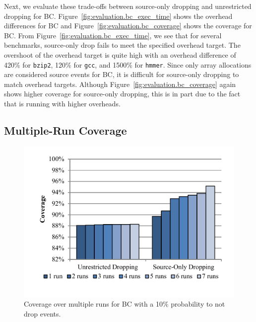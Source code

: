 Next, we evaluate these trade-offs between source-only dropping and unrestricted dropping for BC.
Figure~\ref{fig:evaluation.bc_exec_time} shows the overhead differences for BC
and Figure~\ref{fig:evaluation.bc_coverage} shows the coverage for BC.
From Figure~\ref{fig:evaluation.bc_exec_time}, we see that for several
benchmarks, source-only drop fails to meet the specified overhead target.
The overshoot of the overhead target is quite high with an overhead difference
of 420\% for {\tt bzip2}, 120\% for {\tt gcc}, and 1500\% for {\tt hmmer}.
Since only array allocations are considered source events for BC, it is
difficult for source-only dropping to match overhead targets. Although
Figure~\ref{fig:evaluation.bc_coverage} again shows higher coverage for
source-only dropping, this is in part due to the fact that is running with
higher overheads.

\subsection{Multiple-Run Coverage}

\begin{figure}
  \begin{center}
    \includegraphics[width=\columnwidth]{figs/data_multirun_coverage.pdf}
    \vspace{-0.2in}
    \caption{Coverage over multiple runs for BC with a 10\% probability to not drop events.}
    \label{fig:evaluation.multirun}
    \vspace{-0.1in}
  \end{center}
\end{figure}

